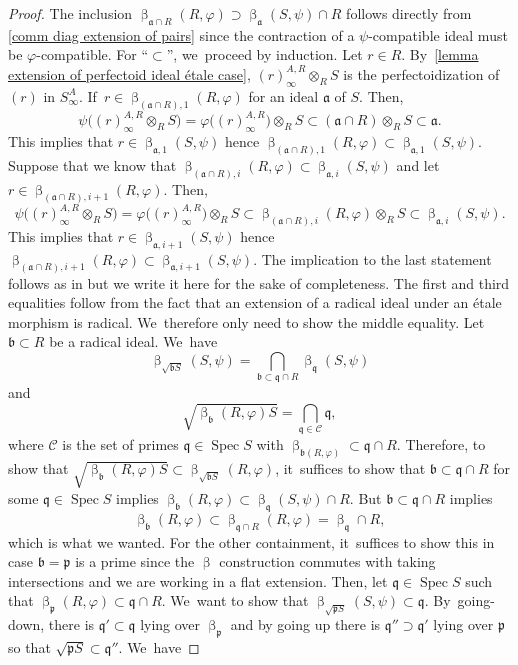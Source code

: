 \documentclass[JEP,XML,SOM,Unicode,published]{cedram}
\let\autoref\cref
\theoremstyle{plain}
\theoremstyle{definition}
\numberwithin{equation}{theorem}
\let\tensor\otimes
\newcommand{\fra}{\mathfrak{a}}
\newcommand{\frab}{\mathfrak{b}}
\newcommand{\p}{\mathfrak{p}}
\newcommand{\q}{\mathfrak{q}}
\DeclareMathOperator{\Spec}{{Spec}}
\newcommand{\ps}{\p S}
\renewcommand{\phi}{\varphi}
\newcommand{\rphi}{(R,\phi)}
\newcommand{\spsi}{(S,\psi)}
\newcommand{\pS}{\p S}
\newcommand{\safty}{S^A_\infty}
\begin{document}
\begin{proof}
The inclusion $\upbeta_{\fra\cap R}\rphi \supset \upbeta_\fra\spsi\cap R $ follows directly from \autoref{comm diag extension of pairs} since the contraction of a $\psi$-compatible ideal must be $\phi$-compatible. For ``$\subset$'', we~proceed by induction. Let $r\in R$. By~\autoref{lemma extension of perfectoid ideal étale case}, $(r)^{A,R}_\infty \tensor_{R} S$ is the perfectoidization of $(r)$ in $\safty$. If~$r\in \upbeta_{(\fra\cap R),1}\rphi$ for an ideal $\fra$ of $S$.
Then,\vspace*{-3pt}
\[
\psi\bigl(\left(r\right)^{A,R}_\infty \tensor_{R} S\bigr) =\phi\bigl( \left(r\right)^{A,R}_\infty\bigr) \tensor_{R} S \subset (\fra \cap R) \tensor_{R} S \subset \fra.
\]
This implies that $r\in \upbeta_{\fra,1}\spsi$ hence
$\upbeta_{(\fra\cap R),1}\rphi \subset \upbeta_{\fra,1}\spsi$. Suppose that we know that $\upbeta_{(\fra\cap R),i}\rphi \subset \upbeta_{\fra,i}\spsi$ and let $r\in \upbeta_{(\fra\cap R), i+1}\rphi$. Then,\vspace*{-3pt}
\[
\psi\bigl(\left(r\right)^{A,R}_\infty \tensor_{R} S\bigr) =\phi\bigl( \left(r\right)^{A,R}_\infty\bigr) \tensor_{R} S \subset \upbeta_{(\fra\cap R),i}\rphi \tensor_R S \subset \upbeta_{\fra,i}\spsi.
\]
This implies that $r\in \upbeta_{\fra, i+1}\spsi$ hence
$\upbeta_{(\fra\cap R),i+1}\rphi \subset \upbeta_{\fra,i+1}\spsi$.
The implication to the last statement follows as in \cite[Def.-Prop.\,5.5]{CarvajalFayolleTameRamificationCFPS} but we write it here for the sake of completeness. The first and third equalities follow from the fact that an extension of a radical ideal under an étale morphism is radical. We~therefore only need to show the middle equality.
Let $\frab\subset R$ be a radical ideal. We~have\vspace*{-3pt}
\[
\upbeta_{\sqrt{\frab S}}\spsi=\bigcap_{\frab\subset \q\cap R}\upbeta_\q\spsi
\]
and\vspace*{-5pt}
\[
\sqrt{\upbeta_\frab\rphi S}=\bigcap_{\q\in \mathcal{C}} \q,
\]
where $\mathcal{C}$ is the set of primes $\q\in \Spec S$ with $\upbeta_{\frab\rphi}\subset \q\cap R$. Therefore, to show that $\sqrt{\upbeta_\frab\rphi S}\subset \upbeta_{\sqrt{\frab S}}\rphi$, it~suffices to show that $\frab\subset \q\cap R$ for some $\q\in \Spec S$ implies $\upbeta_{\frab}\rphi\subset \upbeta_\q\spsi \cap R$. But $\frab\subset \q\cap R$ implies\vspace*{-3pt}
\[
\upbeta_\frab\rphi\subset\upbeta_{\q\cap R}\rphi=\upbeta_{\q}\cap R,
\]
which is what we wanted. For the other containment, it~suffices to show this in case $\frab=\p$ is a prime since the $\upbeta$ construction commutes with taking intersections and we are working in a flat extension. Then, let $\q\in \Spec S$ such that $\upbeta_\p\rphi\subset \q\cap R$. We~want to show that $\upbeta_{\sqrt{\pS}}\spsi \subset \q$. By~going-down, there is $\q'\subset \q$ lying over $\upbeta_\p$ and by going up there is $\q''\supset \q'$ lying over $\p$ so that $\sqrt{\ps}\subset \q''$. We~have\vspace*{-3pt}

\end{proof}
\end{document}
